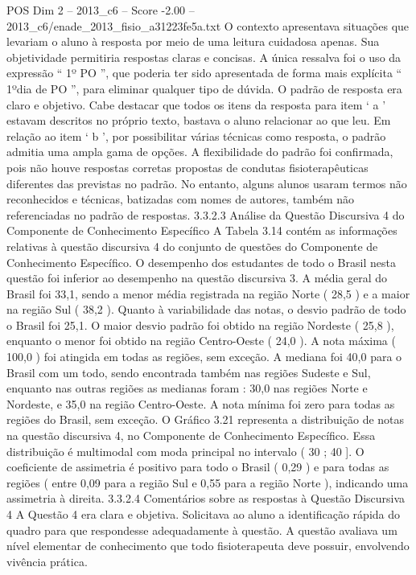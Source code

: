 \begin{textsample}{POS Dim 2 – 2013\_c6 – Score -2.00 – 2013\_c6/enade\_2013\_fisio\_a31223fe5a.txt}
O contexto apresentava situações que levariam o aluno à resposta por meio de uma leitura cuidadosa apenas.
Sua objetividade permitiria respostas claras e concisas.
A única ressalva foi o uso da expressão “ 1º PO ”, que poderia ter sido apresentada de forma mais explícita “ 1ºdia de PO ”, para eliminar qualquer tipo de dúvida.
O padrão de resposta era claro e objetivo.
Cabe destacar que todos os itens da resposta para item ‘ a ’ estavam descritos no próprio texto, bastava o aluno relacionar ao que leu.
Em relação ao item ‘ b ’, por possibilitar várias técnicas como resposta, o padrão admitia uma ampla gama de opções.
A flexibilidade do padrão foi confirmada, pois não houve respostas corretas propostas de condutas fisioterapêuticas diferentes das previstas no padrão.
No entanto, alguns alunos usaram termos não reconhecidos e técnicas, batizadas com nomes de autores, também não referenciadas no padrão de respostas. 3.3.2.3 Análise da Questão Discursiva 4 do Componente de Conhecimento Específico A Tabela 3.14 contém as informações relativas à questão discursiva 4 do conjunto de questões do Componente de Conhecimento Específico.
O desempenho dos estudantes de todo o Brasil nesta questão foi inferior ao desempenho na questão discursiva 3.
A média geral do Brasil foi 33,1, sendo a menor média registrada na região Norte ( 28,5 ) e a maior na região Sul ( 38,2 ).
Quanto à variabilidade das notas, o desvio padrão de todo o Brasil foi 25,1.
O maior desvio padrão foi obtido na região Nordeste ( 25,8 ), enquanto o menor foi obtido na região Centro-Oeste ( 24,0 ).
A nota máxima ( 100,0 ) foi atingida em todas as regiões, sem exceção.
A mediana foi 40,0 para o Brasil com um todo, sendo encontrada também nas regiões Sudeste e Sul, enquanto nas outras regiões as medianas foram : 30,0 nas regiões Norte e Nordeste, e 35,0 na região Centro-Oeste.
A nota mínima foi zero para todas as regiões do Brasil, sem exceção.
O Gráfico 3.21 representa a distribuição de notas na questão discursiva 4, no Componente de Conhecimento Específico.
Essa distribuição é multimodal com moda principal no intervalo ( 30 ; 40 ].
O coeficiente de assimetria é positivo para todo o Brasil ( 0,29 ) e para todas as regiões ( entre 0,09 para a região Sul e 0,55 para a região Norte ), indicando uma assimetria à direita. 3.3.2.4 Comentários sobre as respostas à Questão Discursiva 4 A Questão 4 era clara e objetiva.
Solicitava ao aluno a identificação rápida do quadro para que respondesse adequadamente à questão.
A questão avaliava um nível elementar de conhecimento que todo fisioterapeuta deve possuir, envolvendo vivência prática.

\end{textsample}
